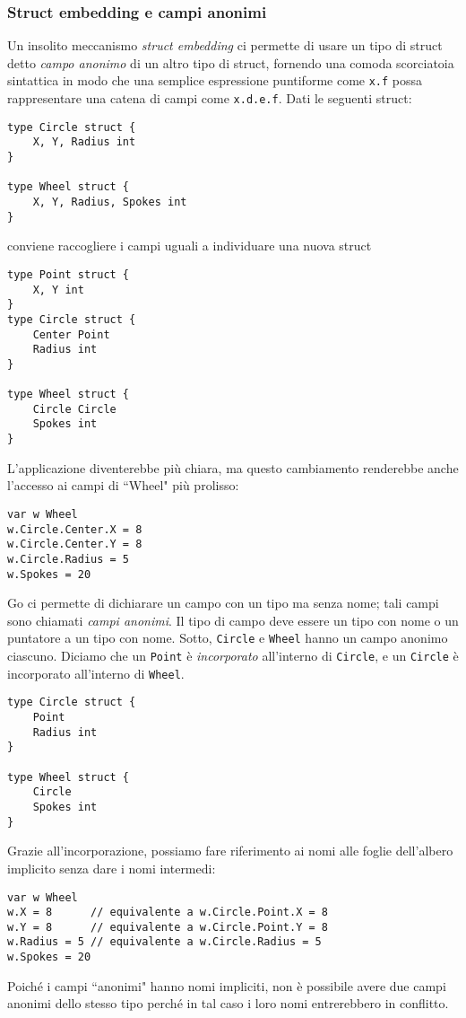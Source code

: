 \documentclass[../../../thesis.tex]{subfiles}
\begin{document}
    \subsubsection{Struct embedding e campi anonimi}
    Un insolito meccanismo \textit{struct embedding} ci permette di usare un tipo di struct detto \textit{campo anonimo} di un altro tipo di struct, fornendo una comoda scorciatoia sintattica in modo che una semplice espressione puntiforme come \verb"x.f" possa rappresentare una catena di campi come \verb"x.d.e.f".
    \clearpage
    \newpage
    Dati le seguenti struct:
    \begin{lstlisting}[frame = single, label = {lst:lstlisting3-4-3.1}]
type Circle struct {
    X, Y, Radius int
}

type Wheel struct {
    X, Y, Radius, Spokes int
}
    \end{lstlisting}
    conviene raccogliere i campi uguali a individuare una nuova struct
    \begin{lstlisting}[frame = single, label = {lst:lstlisting3-4-3.2}]
type Point struct {
    X, Y int
}
type Circle struct {
    Center Point
    Radius int
}

type Wheel struct {
    Circle Circle
    Spokes int
}
    \end{lstlisting}
    L'applicazione diventerebbe più chiara, ma questo cambiamento renderebbe anche l'accesso ai campi di ``Wheel" più prolisso:
    \begin{lstlisting}[frame = single, label = {lst:lstlisting3-4-3.3}]
var w Wheel
w.Circle.Center.X = 8
w.Circle.Center.Y = 8
w.Circle.Radius = 5
w.Spokes = 20
    \end{lstlisting}
    Go ci permette di dichiarare un campo con un tipo ma senza nome;
    tali campi sono chiamati \textit{campi anonimi}.
    Il tipo di campo deve essere un tipo con nome o un puntatore a un tipo con nome.
    Sotto, \verb"Circle" e \verb"Wheel" hanno un campo anonimo ciascuno.
    Diciamo che un \verb"Point" è \textit{incorporato} all'interno di \verb"Circle", e un \verb"Circle" è incorporato all'interno di \verb"Wheel".
    \begin{lstlisting}[frame = single, label = {lst:lstlisting3-4-3.4}]
type Circle struct {
    Point
    Radius int
}

type Wheel struct {
    Circle
    Spokes int
}
    \end{lstlisting}
    Grazie all'incorporazione, possiamo fare riferimento ai nomi alle foglie dell'albero implicito senza dare i nomi intermedi:
    \begin{lstlisting}[frame = single, label = {lst:lstlisting3-4-3.5}]
var w Wheel
w.X = 8	     // equivalente a w.Circle.Point.X = 8
w.Y = 8	     // equivalente a w.Circle.Point.Y = 8
w.Radius = 5 // equivalente a w.Circle.Radius = 5
w.Spokes = 20
    \end{lstlisting}
    Poiché i campi ``anonimi" hanno nomi impliciti, non è possibile avere due campi anonimi dello stesso tipo perché in tal caso i loro nomi entrerebbero in conflitto.
    \hfill \vspace{12pt}
\end{document}

